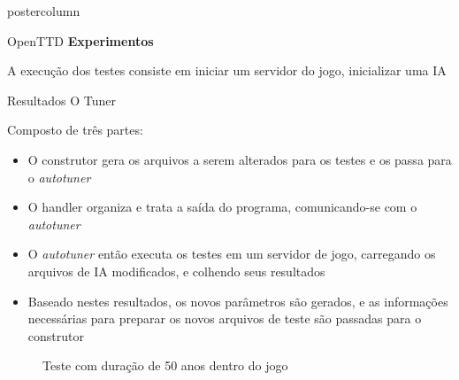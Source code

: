 \documentclass[final]{beamer}
\begin{document}
\begin{frame}
\begin{columns}
\begin{column}{.5\textwidth}
\begin{beamercolorbox}[center,wd=\textwidth]{postercolumn}
\begin{minipage}[T]{.95\textwidth}
{\begin{block}{OpenTTD}
                \textbf{Experimentos}
                
                \vspace*{0.2cm}
                A execução dos testes consiste em iniciar um servidor do jogo, inicializar uma IA
                
                \vspace*{0.5cm} 
            \end{block}

            \vspace*{0.2cm} 
            
            \begin{block}{Resultados}
              \justifying 
                O Tuner
                
                \vspace*{0.2cm} 
                
                Composto de três partes:
                \begin{itemize}
                	\item O construtor gera os arquivos a serem alterados para os testes e os passa para o \textit{autotuner}
                	\item O handler organiza e trata a saída do programa, comunicando-se com o \textit{autotuner}
                	\item O \textit{autotuner} então executa os testes em um servidor de jogo, carregando os arquivos de IA modificados, e colhendo seus resultados
                	\item Baseado nestes resultados, os novos parâmetros são gerados, e as informações necessárias para preparar os novos arquivos de teste são passadas para o construtor
                \end{itemize}
                
                \begin{figure}[htp]
                  \centering
                  \caption{Teste com duração de 50 anos dentro do jogo}
                \end{figure}
                

\end{block}}
\end{minipage}
\end{beamercolorbox}
\end{column}
\end{columns}
\end{frame}
\end{document}
